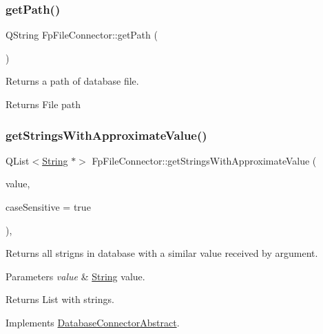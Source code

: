 \subsubsection{\texorpdfstring{get\+Path()}{getPath()}}
{\footnotesize\ttfamily Q\+String Fp\+File\+Connector\+::get\+Path (\begin{DoxyParamCaption}{ }\end{DoxyParamCaption})}



Returns a path of database file. 

\begin{DoxyReturn}{Returns}
File path 
\end{DoxyReturn}
\mbox{\label{classFpFileConnector_adc85e526e1dab9f3de03cb8a2f33f7d1}} 
\subsubsection{\texorpdfstring{get\+Strings\+With\+Approximate\+Value()}{getStringsWithApproximateValue()}}
{\footnotesize\ttfamily Q\+List$<$\mbox{\hyperlink{classString}{String}} $\ast$$>$ Fp\+File\+Connector\+::get\+Strings\+With\+Approximate\+Value (\begin{DoxyParamCaption}\item[{const Q\+String \&}]{value,  }\item[{bool}]{case\+Sensitive = {\ttfamily true} }\end{DoxyParamCaption})\hspace{0.3cm}{\ttfamily [override]}, {\ttfamily [virtual]}}



Returns all strigns in database with a similar value received by argument. 


\begin{DoxyParams}{Parameters}
{\em value} & \mbox{\hyperlink{classString}{String}} value. \\
\hline
\end{DoxyParams}
\begin{DoxyReturn}{Returns}
List with strings. 
\end{DoxyReturn}


Implements \mbox{\hyperlink{classDatabaseConnectorAbstract_a5b0f30372ca105a94073267e969b74ee}{Database\+Connector\+Abstract}}.

